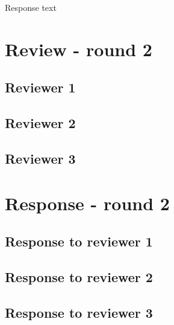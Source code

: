 \documentclass[
  manuscript=editorial,
  layout=publish,
  year=20xx,
  volume=x,
]{extra/review}
\begin{document}
\begin{response}
Response text
\end{response}


\section{Review - round 2}

\subsection{Reviewer 1}
\subsection{Reviewer 2}
\subsection{Reviewer 3}

\section{Response - round 2}

\subsection{Response to reviewer 1}
\subsection{Response to reviewer 2}
\subsection{Response to reviewer 3}

\printbibliography
\end{document}
